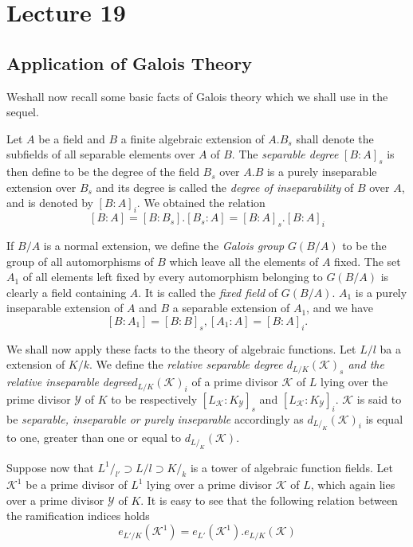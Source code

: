 \chapter{Lecture 19}\label{chap19}

\setcounter{section}{32}
\section{Application of Galois Theory}\label{chap19:sec33}%

We\pageoriginale shall now recall some basic facts of Galois theory which we shall
use in the sequel. 

Let $A$ be a field and $B$ a finite algebraic extension of $A. B_s$
shall denote the subfields of all separable elements over $A$ of
$B$. The \textit{ separable degree } $[B : A]_s$ is then define to be
the degree of the field $B_s$ over $A.B$ is a purely inseparable
extension over $B_s$ and its degree is called the \textit{degree of
  inseparability} of $B$ over $A$, and is denoted by $[B:A]_i$. We
obtained the relation 
$$
[B:A]=[B:B_s].[B_s:A]=[B:A]_s.[B:A]_i
$$

If $B/A$ is a normal extension, we define the \textit{Galois group}
$G(B/A)$ to be the group of all automorphisms of $B$ which
leave all the elements of $A$ fixed. The set $A_1$ of all elements
left fixed by every automorphism belonging to $G(B/A)$ is clearly a
field containing $A$. It is called the \textit{fixed field} of
$G(B/A)$. $A_1$ is a purely inseparable extension of $A$ and $B$ a
separable extension of $A_1$, and  we have 
$$
[B:A_1]=[B:B]_s, [A_1:A]=[B:A]_i.
$$

We shall now apply these facts to the theory of algebraic
functions. Let $L/l$ ba a extension of $K/k$. We define the
\textit{relative separable degree $d_{L/K}(\mathscr{K})_s$ and the
  relative inseparable}  
\textit{degree}\pageoriginale $d_{L /K}(\mathscr{K})_i$ of a prime divisor
$\mathscr{K}$ of $L$ lying over the prime divisor $\mathscr{Y}$ of $K$
to be respectively $[L _\mathscr{K} : K_\mathscr{Y}]_s$ and
$[L_\mathscr{K} : K_\mathscr{Y}]_i$. $\mathscr{K}$ is said to be
\textit{separable, inseparable or purely inseparable } accordingly as
$d_{L/ _K}(\mathscr{K})_i$ is equal to one, greater than one or equal
to $d_{L/_K}(\mathscr{K})$. 

Suppose now that $L^{1} /_{l'}  \supset {L /l} \supset K / _k$ is a
tower of algebraic function fields. Let $\mathscr{K}^1$ be a prime
divisor of $L^1$ lying over a prime divisor $\mathscr{K}$ of $L$,
which again lies  over a prime divisor $\mathscr{Y}$ of $K$. It is
easy to see that the following relation  between the ramification
indices holds 
$$
e_{L'/K} (\mathscr{K}^1) = e_{L'} (\mathscr{K}^1). e_{L /K}(\mathscr{K})
$$ 

